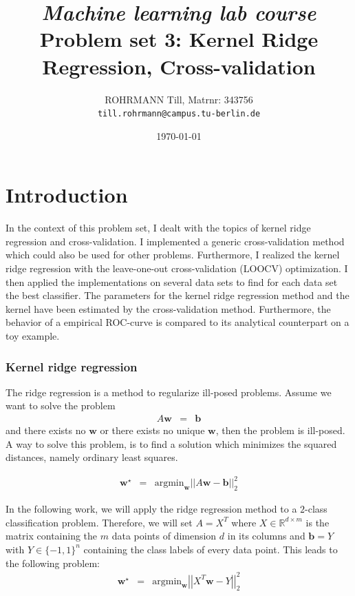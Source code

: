 \documentclass[a4paper, 11pt, titlepage]{article}
\title
{{\em Machine learning lab course}\\
Problem set 3: Kernel Ridge Regression, Cross-validation}
\author{ROHRMANN Till, Matrnr: 343756\\
\texttt{till.rohrmann@campus.tu-berlin.de}}
\date{\today}
\newcommand{\norm}[1]{\left|\left|#1\right|\right|}
\newcommand{\argmin}{\text{argmin}}
\begin{document}
\maketitle

\part{Introduction}
\label{part:introduction}

In the context of this problem set, I dealt with the topics of kernel ridge regression and cross-validation.
I implemented a generic cross-validation method which could also be used for other problems.
Furthermore, I realized the kernel ridge regression with the leave-one-out cross-validation (LOOCV) optimization.
I then applied the implementations on several data sets to find for each data set the best classifier.
The parameters for the kernel ridge regression method and the kernel have been estimated by the cross-validation method.
Furthermore, the behavior of a empirical ROC-curve is compared to its analytical counterpart on a toy example.

\section{Kernel ridge regression}

The ridge regression is a method to regularize ill-posed problems.
Assume we want to solve the problem
\begin{eqnarray*}
	A\mathbf{w} &=& \mathbf{b}
\end{eqnarray*}
and there exists no $\mathbf{w}$ or there exists no unique $\mathbf{w}$, then the problem is ill-posed.
A way to solve this problem, is to find a solution which minimizes the squared distances, namely ordinary least squares.

\begin{eqnarray*}
	\mathbf{w}^\star &=&\argmin_{\mathbf{w}} \norm{A\mathbf{w} - \mathbf{b}}^2_{2}
\end{eqnarray*}

In the following work, we will apply the ridge regression method to a $2$-class classification problem.
Therefore, we will set $A=X^T$ where $X\in \mathbb{R}^{d\times m}$ is the matrix containing the $m$ data points of dimension $d$ in its columns and $\mathbf{b}=Y$ with $Y\in \{-1,1\}^n$ containing the class labels of every data point.
This leads to the following problem:
\begin{eqnarray}
	\mathbf{w}^\star &=&\argmin_{\mathbf{w}} \norm{X^T\mathbf{w} - Y}^2_{2} \label{eq:ols}
\end{eqnarray}
\end{document}
